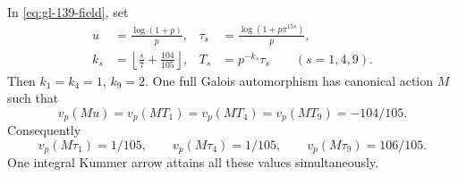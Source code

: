 \begin{theorem}
\label{thm:gl-three-labels}
In \eqref{eq:gl-139-field}, set
\begin{equation}\label{eq:gl-139-vectors}
 \begin{aligned}
 u&=\frac{\log(1+p)}p, &
 \tau_s&=\frac{\log(1+p\pi^{15s})}p,\\
 k_s&=\left\lfloor\frac s7+\frac{104}{105}\right\rfloor,&
 T_s&=p^{-k_s}\tau_s\qquad(s=1,4,9).
 \end{aligned}
\end{equation}
Then $k_1=k_4=1$, $k_9=2$. One full Galois automorphism has
canonical action $M$ such that
\begin{equation}\label{eq:gl-139-minimum}
 v_p(Mu)=v_p(MT_1)=v_p(MT_4)=v_p(MT_9)=-104/105.
\end{equation}
Consequently
\begin{equation}\label{eq:gl-139-theta}
 v_p(M\tau_1)=1/105,\qquad v_p(M\tau_4)=1/105,
 \qquad v_p(M\tau_9)=106/105.
\end{equation}
One integral Kummer arrow attains all these values simultaneously.
\end{theorem}
